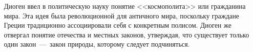 

Диоген ввел в политическую науку понятие <<космополита>> или гражданина мира. Эта идея была революционной для античного мира, поскольку граждане Греции традиционно ассоциировали себя с конкретным полисом. Диоген же отвергал понятие отечества и местных законов, утверждая, что существует только один закон~---~закон природы, которому следует подчиняться.

